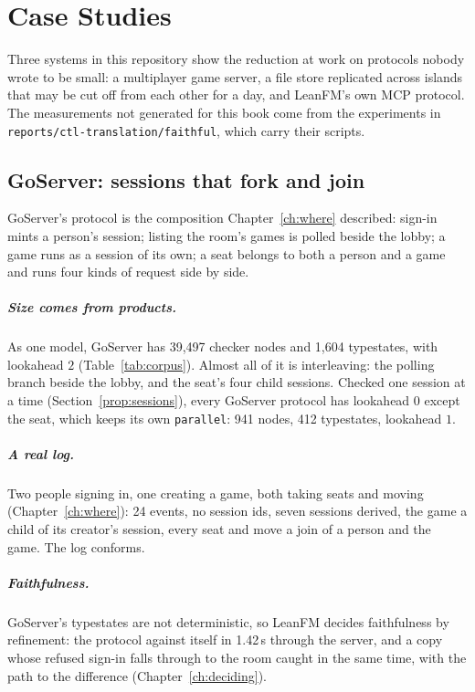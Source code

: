 \chapter{Case Studies}\label{ch:cases}

Three systems in this repository show the reduction at work on protocols nobody wrote
to be small: a multiplayer game server, a file store replicated across islands that may
be cut off from each other for a day, and LeanFM's own MCP protocol. The measurements
not generated for this book come from the experiments in
\texttt{reports/ctl-translation/faithful}, which carry their scripts.

\section{GoServer: sessions that fork and join}

GoServer's protocol is the composition Chapter~\ref{ch:where} described: sign-in mints a
person's session; listing the room's games is polled beside the lobby; a game runs as a
session of its own; a seat belongs to both a person and a game and runs four kinds of
request side by side.

\paragraph{Size comes from products.} As one model, GoServer has 39{,}497 checker nodes
and 1{,}604 typestates, with lookahead $2$ (Table~\ref{tab:corpus}). Almost all of it is
interleaving: the polling branch beside the lobby, and the seat's four child sessions.
Checked one session at a time (Section~\ref{prop:sessions}), every GoServer protocol
has lookahead $0$ except the seat, which keeps its own \texttt{parallel}: 941 nodes, 412
typestates, lookahead $1$.

\paragraph{A real log.} Two people signing in, one creating a game, both taking seats
and moving (Chapter~\ref{ch:where}): 24 events, no session ids, seven sessions derived,
the game a child of its creator's session, every seat and move a join of a person and
the game. The log conforms.

\paragraph{Faithfulness.} GoServer's typestates are not deterministic, so LeanFM decides
faithfulness by refinement: the protocol against itself in 1.42\,s through the server,
and a copy whose refused sign-in falls through to the room caught in the same time, with
the path to the difference (Chapter~\ref{ch:deciding}).


